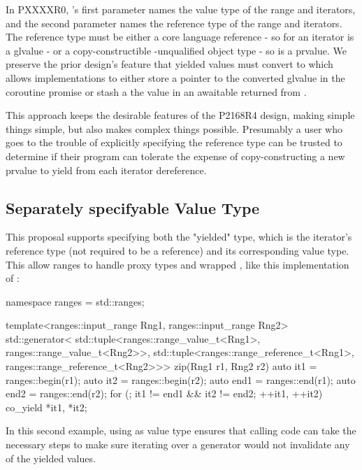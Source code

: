 \documentclass{wg21}
\begin{document}
In PXXXXR0, 's first parameter  names
the value type of the range and iterators,
and the second parameter  names
the reference type of the range and iterators.
The reference type must be either a core language reference -
so  for an iterator  is a glvalue -
or a copy-constructible \cv-unqualified object type -
so  is a prvalue.
We preserve the prior design's feature that yielded values must convert to
which allows implementations to either store
a pointer to the converted glvalue in the coroutine promise or
stash a the value in an awaitable returned from .

This approach keeps the desirable features of the P2168R4 design,
making simple things simple,
but also makes complex things possible.
Presumably a user who goes to the trouble of explicitly specifying
the reference type can be trusted to determine if their program can tolerate
the expense of copy-constructing a new prvalue
to yield from each iterator dereference.

\subsection{Separately specifyable Value Type}

This proposal supports specifying both the "yielded" type, which is the iterator's reference type (not required to be a reference) and its corresponding value type.
This allow ranges to handle proxy types and wrapped , like this implementation of :

\begin{colorblock}
namespace ranges = std::ranges;

template<ranges::input_range Rng1, ranges::input_range Rng2>
std::generator<
    std::tuple<ranges::range_value_t<Rng1>, ranges::range_value_t<Rng2>>,
    std::tuple<ranges::range_reference_t<Rng1>, ranges::range_reference_t<Rng2>>>
zip(Rng1 r1, Rng2 r2) {
    auto it1 = ranges::begin(r1);
    auto it2 = ranges::begin(r2);
    auto end1 = ranges::end(r1);
    auto end2 = ranges::end(r2);
    for (; it1 != end1 && it2 != end2; ++it1, ++it2) {
        co_yield {*it1, *it2};
    }
}
\end{colorblock}

In this second example, using  as value type ensures that calling code can take the necessary steps
to make sure iterating over a generator would not invalidate any of the yielded values.
\end{document}
